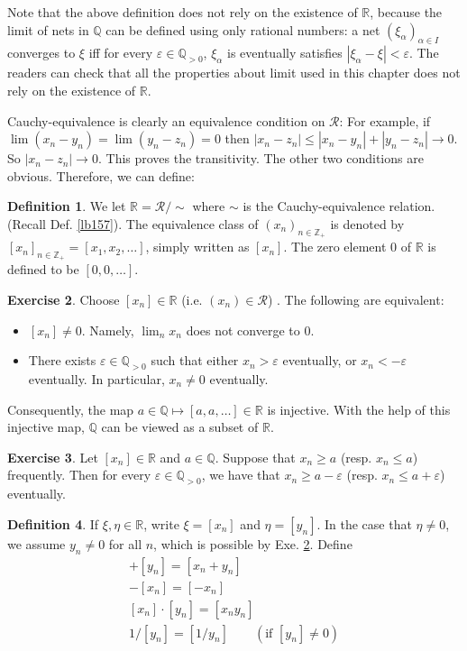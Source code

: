 \documentclass[12pt,b5paper,notitlepage]{article}
\theoremstyle{definition}
\newtheorem{df}{Definition}[section]
\newtheorem{exe}[df]{Exercise}
\theoremstyle{plain}
\newcommand{\scr}{\mathscr}
\newcommand{\Zbb}{\mathbb Z}
\newcommand{\Qbb}{\mathbb Q}
\newcommand{\Rbb}{\mathbb R}
\newcommand{\eps}{\varepsilon}
\numberwithin{equation}{section}
\begin{document}
Note that the above definition does not rely on the existence of $\Rbb$, because the limit of nets in $\Qbb$ can be defined using only rational numbers: a net $(\xi_\alpha)_{\alpha\in I}$ converges to $\xi$ iff for every $\eps\in\Qbb_{>0}$, $\xi_\alpha$ is eventually satisfies $|\xi_\alpha-\xi|<\eps$. The readers can check that all the properties about limit used in this chapter does not rely on the existence of $\Rbb$.

Cauchy-equivalence is clearly an equivalence condition on $\scr R$: For example, if $\lim (x_n-y_n)=\lim(y_n-z_n)=0$ then $|x_n-z_n|\leq |x_n-y_n|+|y_n-z_n|\rightarrow 0$. So $|x_n-z_n|\rightarrow0$. This proves the transitivity. The other two conditions are obvious. Therefore, we can define:

\begin{df}
We let $\Rbb=\scr R/\sim$ where $\sim$ is the Cauchy-equivalence relation. (Recall Def. \ref{lb157}). The equivalence class of $(x_n)_{n\in\Zbb_+}$ is denoted by $[x_n]_{n\in\Zbb_+}=[x_1,x_2,\dots]$, simply written as $[x_n]$. The zero element $0$ of $\Rbb$ is defined to be $[0,0,\dots]$. 
\end{df}




\begin{exe}\label{lb160}
Choose $[x_n]\in\Rbb$ (i.e. $(x_n)\in\scr R$) . The following are equivalent:
\begin{itemize}
\item[(1)] $[x_n]\neq 0$. Namely, $\lim_n x_n$ does not converge to $0$.
\item[(2)] There exists $\eps\in\Qbb_{>0}$ such that either $x_n>\eps$ eventually, or $x_n<-\eps$ eventually. In particular, $x_n\neq 0$ eventually.
\end{itemize}
Consequently, the map $a\in\Qbb\mapsto [a,a,\dots]\in\Rbb$ is injective. With the help of this injective map, $\Qbb$ can be viewed as a subset of $\Rbb$.
\end{exe}


\begin{exe}\label{lb159}
Let $[x_n]\in\Rbb$ and $a\in\Qbb$. Suppose that $x_n\geq a$ (resp. $x_n\leq a$) frequently.  Then for every $\eps\in\Qbb_{>0}$, we have that $x_n\geq a-\eps$ (resp. $x_n\leq a+\eps$) eventually.
\end{exe}





\begin{df}\label{lb158}
If $\xi,\eta\in\Rbb$, write $\xi=[x_n]$ and $\eta=[y_n]$. In the case that $\eta\neq0$, we assume $y_n\neq 0$ for all $n$, which is possible by Exe. \ref{lb160}. Define
\begin{gather*}
[x_n]+ [y_n]=[x_n+ y_n]\\
-[x_n]=[-x_n]\\
[x_n]\cdot [y_n]=[x_ny_n]\\
1/[y_n]=[1/y_n]\qquad(\text{if }[y_n]\neq0)
\end{gather*}
\end{df}
\end{document}
